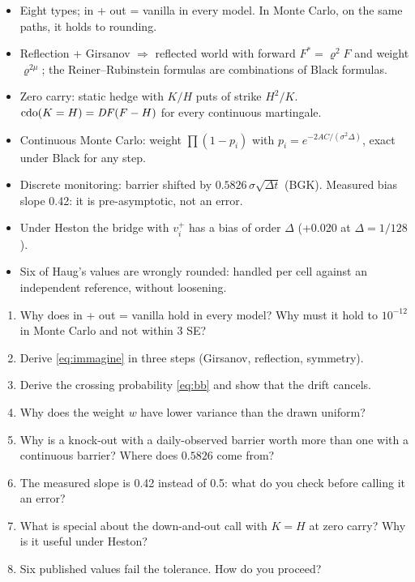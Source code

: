 \begin{riassunto}
\begin{itemize}
\item Eight types; in + out = vanilla in every model. In Monte Carlo, on the same paths, it holds to rounding.
\item Reflection + Girsanov $\Rightarrow$ reflected world with forward $F^*=\varrho^2F$ and weight $\varrho^{2\mu}$;
the Reiner--Rubinstein formulas are combinations of Black formulas.
\item Zero carry: static hedge with $K/H$ puts of strike $H^2/K$. $\text{cdo}(K=H)=\mathit{DF}(F-H)$ for every continuous
martingale.
\item Continuous Monte Carlo: weight $\prod(1-p_i)$ with $p_i=e^{-2AC/(\sigma^2\Delta)}$, exact under Black for any
step.
\item Discrete monitoring: barrier shifted by $0.5826\,\sigma\sqrt{\Delta t}$ (BGK). Measured bias slope 0.42: it is
pre-asymptotic, not an error.
\item Under Heston the bridge with $v_i^+$ has a bias of order $\Delta$ (+0.020 at $\Delta=1/128$).
\item Six of Haug's values are wrongly rounded: handled per cell against an independent reference, without loosening.
\end{itemize}
\end{riassunto}

\begin{domande}
\begin{enumerate}
\item Why does in + out = vanilla hold in every model? Why must it hold to $10^{-12}$ in Monte Carlo and not within
3 SE?
\item Derive \eqref{eq:immagine} in three steps (Girsanov, reflection, symmetry).
\item Derive the crossing probability \eqref{eq:bb} and show that the drift cancels.
\item Why does the weight $w$ have lower variance than the drawn uniform?
\item Why is a knock-out with a daily-observed barrier worth more than one with a continuous barrier? Where does
$0.5826$ come from?
\item The measured slope is 0.42 instead of 0.5: what do you check before calling it an error?
\item What is special about the down-and-out call with $K=H$ at zero carry? Why is it useful under Heston?
\item Six published values fail the tolerance. How do you proceed?
\end{enumerate}
\end{domande}
